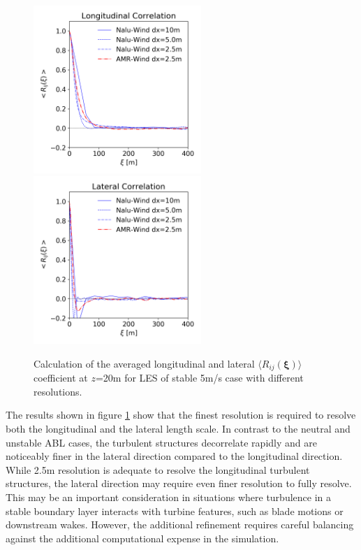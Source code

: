 \begin{figure}%
  \centering
  \\
  \includegraphics[width=2.5in]{figures/GridStudy_Rij_Longitudinal.png}
  \includegraphics[width=2.5in]{figures/GridStudy_Rij_Lateral.png}
  \caption{\label{fig:GridStudyRij} Calculation of the averaged
    longitudinal and lateral $\langle R_{ij}(\boldsymbol{\xi})
    \rangle$ coefficient at $z$=20m for LES of stable 5m/s case with
    different resolutions.}
\end{figure}

The results shown in figure \ref{fig:GridStudyRij} show that the
finest resolution is required to resolve both the longitudinal and the
lateral length scale.  In contrast to the neutral and unstable ABL
cases, the turbulent structures decorrelate rapidly and are noticeably
finer in the lateral direction compared to the longitudinal direction.
While 2.5m resolution is adequate to resolve the longitudinal
turbulent structures, the lateral direction may require even finer
resolution to fully resolve.  This may be an important consideration
in situations where turbulence in a stable boundary layer interacts
with turbine features, such as blade motions or downstream wakes.
However, the additional refinement requires careful balancing against
the additional computational expense in the simulation.

